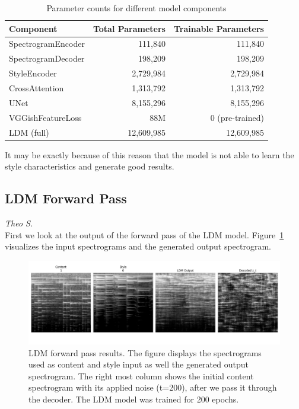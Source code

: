 \begin{table}[h]
\centering
\caption{Parameter counts for different model components}
\label{tab:param_counts}
\begin{tabular}{lrr}
\hline
\textbf{Component} & \textbf{Total Parameters} & \textbf{Trainable Parameters} \\
\hline
SpectrogramEncoder & 111,840 & 111,840 \\
SpectrogramDecoder & 198,209 & 198,209 \\
StyleEncoder & 2,729,984 & 2,729,984 \\
CrossAttention & 1,313,792 & 1,313,792 \\
UNet & 8,155,296 & 8,155,296 \\
VGGishFeatureLoss & 88M & 0 (pre-trained)\\
\hline
LDM (full) & 12,609,985 & 12,609,985 \\
\hline
\end{tabular}
\end{table}

\noindent It may be exactly because of this reason that the model is not able to learn the style characteristics and generate good results.


\subsection{LDM Forward Pass}
\textit{Theo S.}\\
First we look at the output of the forward pass of the LDM model.
Figure~\ref{fig:ldm_forward_pass} visualizes the input spectrograms and the generated output spectrogram.

\begin{figure}[h]
    \centering
    \includegraphics[width=\textwidth]{figures/test_ldm_forward_function_output_200epochs.png}
    \caption{LDM forward pass results.
    The figure displays the spectrograms used as content and style input as well the generated output spectrogram. 
    The right most column shows the initial content spectrogram with its applied noise (t=200), after we pass it through the decoder. 
    The LDM model was trained for 200 epochs.}
    \label{fig:ldm_forward_pass}
\end{figure}

